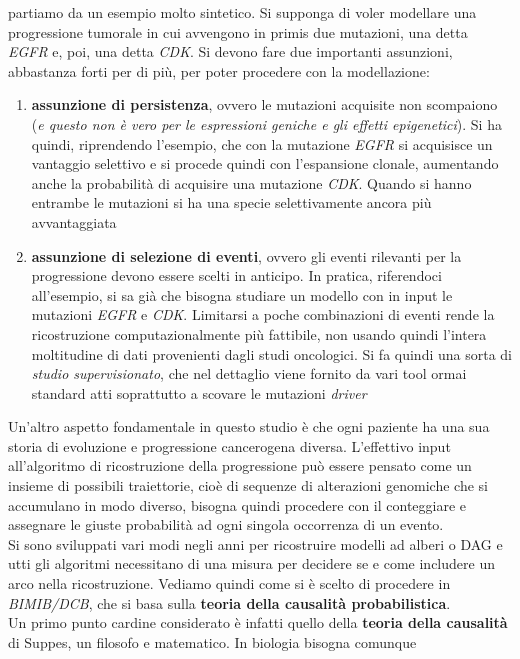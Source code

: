\documentclass[a4paper,12pt, oneside]{book}
\begin{document}
partiamo da un esempio molto sintetico. Si supponga di voler modellare una
progressione tumorale in cui avvengono in primis due mutazioni, una detta
\textit{EGFR} e, poi, una detta \textit{CDK}. Si devono fare due importanti
assunzioni, abbastanza forti per di più, per poter procedere con la
modellazione: 
\begin{enumerate}
  \item \textbf{assunzione di persistenza}, ovvero le mutazioni acquisite non
  scompaiono (\textit{e questo non è vero per le espressioni geniche e gli
    effetti epigenetici}). Si ha quindi, riprendendo l'esempio, che con la
  mutazione \textit{EGFR} si acquisisce un vantaggio selettivo e si procede
  quindi con l'espansione clonale, aumentando anche la probabilità di acquisire
  una mutazione \textit{CDK}. Quando si hanno entrambe le mutazioni si ha una
  specie selettivamente ancora più avvantaggiata
  \item \textbf{assunzione di selezione di eventi}, ovvero gli eventi rilevanti
  per la progressione devono essere scelti in anticipo. In pratica, riferendoci
  all'esempio, si sa già che bisogna studiare un modello con in input le
  mutazioni \textit{EGFR} e \textit{CDK}. Limitarsi a poche combinazioni di
  eventi rende la ricostruzione computazionalmente più fattibile, non usando
  quindi l'intera moltitudine di dati provenienti dagli studi oncologici. Si fa
  quindi una sorta di \textit{studio supervisionato}, che nel dettaglio viene
  fornito da vari tool ormai standard atti soprattutto a scovare le mutazioni
  \textit{driver} 
\end{enumerate}
Un'altro aspetto fondamentale in questo studio è che ogni paziente ha una sua
storia di evoluzione e progressione cancerogena diversa.  L'effettivo input
all'algoritmo di ricostruzione della progressione può essere pensato come un
insieme di possibili traiettorie, cioè di sequenze di alterazioni genomiche che
si accumulano in modo diverso, bisogna quindi procedere con il conteggiare e
assegnare le giuste probabilità ad ogni singola occorrenza di un evento.\\
Si sono sviluppati vari modi negli anni per ricostruire modelli ad alberi o DAG
e utti gli algoritmi necessitano di una misura per decidere se e come includere
un arco nella ricostruzione. Vediamo quindi come si è scelto di procedere in
\textit{BIMIB/DCB}, che si basa sulla \textbf{teoria della causalità
  probabilistica}. \\
Un primo punto cardine considerato è infatti quello della \textbf{teoria della
  causalità} di Suppes, un filosofo e matematico. In biologia bisogna comunque
\end{document}
